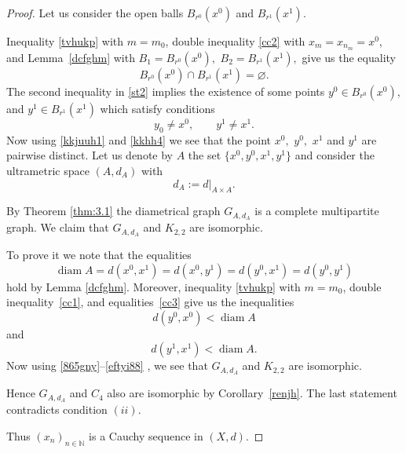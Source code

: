 \documentclass[10pt,a4paper]{amsart}
\begin{document}
\begin{proof}
Let us consider the open balls $B_{r^0}(x^0)$ and $B_{r^1}(x^1)$.  

Inequality \eqref{tvhukp} with $m=m_0$, double inequality \eqref{cc2}  with $x_m=x_{n_m} = x^0$, and Lemma~\ref{dcfghm} with 
    $B_1 = B_{r^0}(x^0),$ $ B_2 = B_{r^1}(x^1),$
 give us the equality
\begin{equation}
    \label{kkjuuh1}
    B_{r^0}(x^0) \cap B_{r^1}(x^1) = \varnothing.
\end{equation}
The second inequality in \eqref{st2} implies the existence of some points
$
y^0 \in B_{r^0}(x^0),$ and $ y^1 \in B_{r^1}(x^1)
$
which satisfy conditions
\begin{equation}
\label{kkhh4}
y_0 \neq x^0, \qquad y^1 \neq x^1. 
\end{equation}
Now using \eqref{kkjuuh1} and \eqref{kkhh4} we see that the point $x^0,$ $y^0,$ $x^1$ and $y^1$ are pairwise distinct.
Let us denote by $A$ the set $\{x^0, y^0, x^1, y^1\}$ and consider the ultrametric space $(A, d_A)$ with
\[
d_A := d\big|_{A \times A}.
\]

By Theorem \ref{thm:3.1} the diametrical graph $G_{A,d_A}$ is a complete multipartite graph.  
We claim that $G_{A,d_A}$ and $K_{2,2}$ are isomorphic.

To prove it we note that the equalities
\begin{equation}
    \label{865gny}
\operatorname{diam} A=d(x^0, x^1) = d(x^0, y^1) = d(y^0, x^1) = d(y^0, y^1)
\end{equation}
hold by Lemma \ref{dcfghm}.
Moreover, inequality \eqref{tvhukp} with $m=m_0$, double inequality~\eqref{cc1}, 
and equalities~\eqref{cc3} give us the inequalities
\begin{equation}
    \label{vnhgefk}
d(y^0,x^0) <\operatorname{diam} A
\end{equation}
and
\begin{equation}
\label{eftyi88}
d(y^1,x^1) <\operatorname{diam} A. 
\end{equation}
Now using \eqref{865gny}--\eqref{eftyi88} , we see that $G_{A,d_A}$ and $K_{2,2}$ are isomorphic.  

Hence $G_{A,d_A}$ and $C_4$ also are isomorphic by Corollary~\ref{renjh}.  
The last statement contradicts condition $(ii)$.  

Thus $(x_n)_{n \in \mathbb{N}}$ is a Cauchy sequence in $(X,d)$. 


\end{proof}
\end{document}
